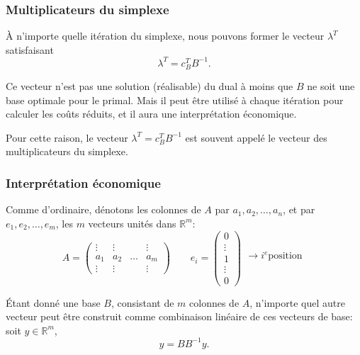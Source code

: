 \documentclass[usepdftitle=false]{beamer}
\def\RR{\mathbb{R}}
\begin{document}
\begin{frame}
	\frametitle{Multiplicateurs du simplexe}
	
	\`A n'importe quelle itération du simplexe, nous pouvons former le vecteur $\lambda^T$ satisfaisant
	\[
	\lambda^T = c_B^T B^{-1}.
	\]
	
	\mbox{}
	
	Ce vecteur n'est pas une solution (réalisable) du dual à moins que $B$ ne soit une base optimale pour le primal. Mais il peut être utilisé à chaque itération pour calculer les coûts réduits, et il aura une interprétation économique.
	
	\mbox{}
	
	Pour cette raison, le vecteur $\lambda^T = c_B^T B^{-1}$ est souvent appelé le vecteur des multiplicateurs du simplexe.
	
\end{frame}

\begin{frame}
	\frametitle{Interprétation économique}
	
	Comme d'ordinaire, dénotons les colonnes de $A$ par $a_1, a_2,\ldots, a_n$, et par $e_1, e_2,\ldots, e_m$, les $m$ vecteurs unités dans $\RR^m$:
	\[
	A = \begin{pmatrix}
		\vdots & \vdots & & \vdots \\
		a_1 & a_2 & \ldots & a_m \\
		\vdots & \vdots & & \vdots
	\end{pmatrix}
	\qquad
	e_i = \begin{pmatrix}
		0 \\
		\vdots \\
		1 \\
		\vdots \\
		0
	\end{pmatrix}
	\begin{matrix}
		\\
		\\
		\rightarrow i^e \mbox{position} \\
		\\
		\\
	\end{matrix}
	\]
	
	\mbox{}
	
	\'Etant donné une base $B$, consistant de $m$ colonnes de $A$, n'importe quel autre vecteur peut être construit comme combinaison linéaire de ces vecteurs de base: soit $y \in \RR^m$,
	\[
	y = B B^{-1}y.
	\]
	
\end{frame}
\end{document}

